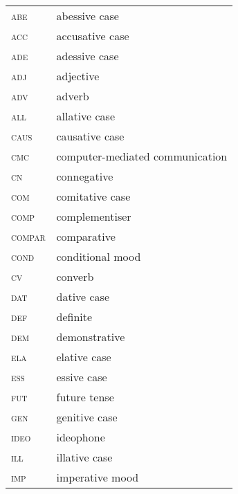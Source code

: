 \documentclass[output=paper,colorlinks,citecolor=brown]{langscibook}
\begin{document}
\begin{tabularx}{.45\textwidth}{lQ}
\textsc{abe} & abessive case\\
\textsc{acc} & accusative case\\
\textsc{ade} & adessive case\\
\textsc{adj} & adjective\\
\textsc{adv} & adverb\\
\textsc{all} & allative case\\
\textsc{caus} & causative case\\
\textsc{cmc} & computer-mediated communication\\
\textsc{cn} & connegative\\
\textsc{com} & comitative case\\
\textsc{comp} & complementiser\\
\textsc{compar} & comparative\\
\textsc{cond} & conditional mood\\
\textsc{cv} & converb\\
\textsc{dat} & dative case\\
\textsc{def} & definite\\
\textsc{dem} & demonstrative\\
\textsc{ela} & elative case\\
\textsc{ess} & essive case\\
\textsc{fut} & future tense\\
\textsc{gen} & genitive case\\
\textsc{ideo} & ideophone\\
\textsc{ill} & illative case\\
\textsc{imp} & imperative mood\\
\end{tabularx}
\end{document}
